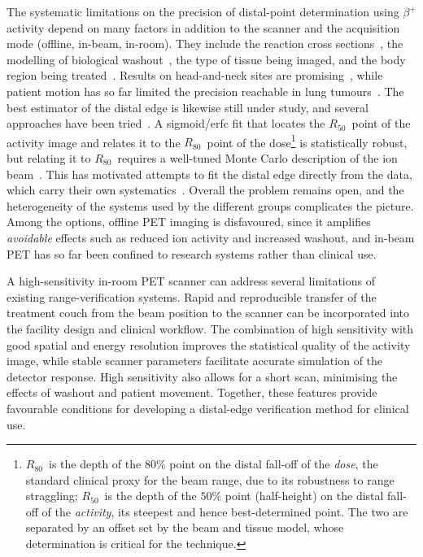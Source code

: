 \documentclass[11pt]{article}
\newcommand{\Rc}{\ensuremath{R_{50}}}
\newcommand{\Roc}{\ensuremath{R_{80}}}
\begin{document}
The systematic limitations on the precision of distal-point determination using $\beta^+$ activity depend
on many factors in addition to the scanner and the acquisition mode (offline,
in-beam, in-room). They include the reaction cross
sections~\cite{Espana2011}, the modelling of biological
washout~\cite{Mizuno2003,parodi2008}, the type of tissue being imaged, and the
body region being treated~\cite{Knopf2009}. Results on head-and-neck sites are
promising~\cite{Knopf2009,Min2013}, while patient motion has so far limited the
precision reachable in lung tumours~\cite{Knopf2009}. The best estimator of the
distal edge is likewise still under study, and several approaches have been
tried~\cite{grogg2013}. A sigmoid/erfc fit that locates the \Rc\ point of the
activity image and relates it to the \Roc\ point of the dose\footnote{\Roc\ is the depth of the $80\%$ point on the
distal fall-off of the \emph{dose}, the standard clinical proxy for the beam
range, due to its robustness to range straggling; \Rc\ is the depth of the $50\%$ point (half-height) on the distal fall-off of the
\emph{activity}, its steepest and hence best-determined point. The two are
separated by an offset set by the beam and tissue model, whose determination is critical for the technique.
} is statistically
robust, but relating it to \Roc\ requires a well-tuned Monte Carlo description of the ion
beam~\cite{Espana2011}. This has motivated attempts to fit the distal edge
directly from the data, which carry their own systematics~\cite{grogg2013}.
Overall the problem remains open, and the heterogeneity of the systems used by
the different groups complicates the picture. Among the options, offline PET
imaging is disfavoured, since it amplifies \emph{avoidable} effects such as
reduced ion activity and increased washout, and in-beam PET has so far been
confined to research systems rather than clinical use.

A high-sensitivity in-room PET scanner can address several limitations of existing range-verification systems. Rapid and reproducible transfer of the treatment couch from the beam position to the scanner can be incorporated into the facility design and clinical workflow. The combination of high sensitivity with good spatial and energy resolution improves the statistical quality of the activity image, while stable scanner parameters facilitate accurate simulation of the detector response. High sensitivity also allows for a short scan, minimising the effects of washout and patient movement. Together, these features provide favourable conditions for developing a distal-edge verification method for clinical use.
\end{document}
